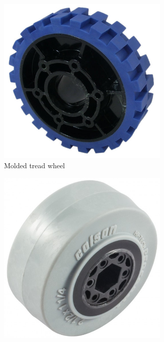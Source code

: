 	\begin{figure}[H]
		\begin{subfigure}[b]{.24\linewidth}
			\includegraphics[width=0.9\textwidth]{imgs/wheel_higrip.png}
			\caption{Molded tread wheel}
		\end{subfigure}\begin{subfigure}[b]{.24\linewidth}
			\includegraphics[width=0.9\textwidth]{imgs/wheel_colson.png}

\end{subfigure}
\end{figure}
